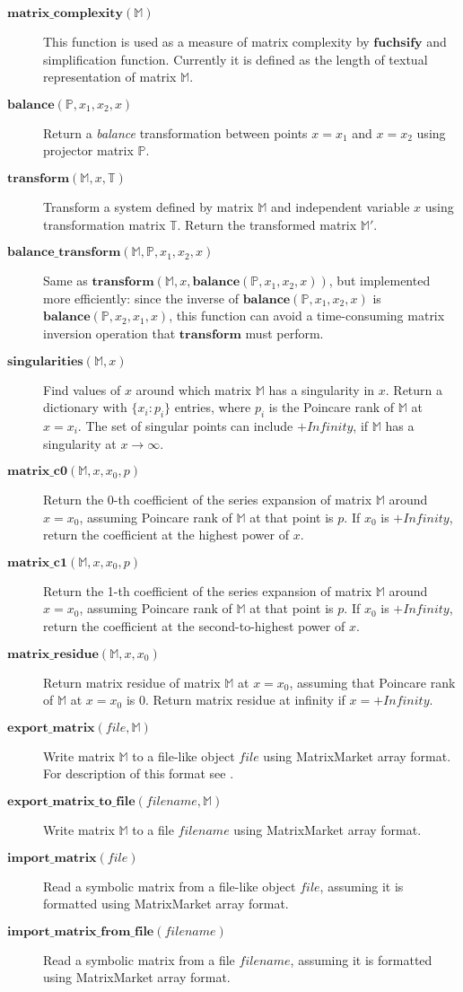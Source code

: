 \documentclass[12pt,a4paper]{article}
\def\F#1{\mathbf{#1}} %
\def\M#1{\mathbb{#1}} %
\def\functionitem#1#2{\item[$\F{#1}(#2)$]}
\begin{document}
\begin{description}
\functionitem{matrix\_complexity}{\M M}
This function is used as a measure of matrix complexity by
$\F{fuchsify}$ and simplification function. Currently it is
defined as the length of textual representation of matrix $\M M$.

\functionitem{balance}{\M P, x_1, x_2, x}
Return a \textit{balance} transformation between points $x=x_1$
and $x=x_2$ using projector matrix $\M P$.

\functionitem{transform}{\M M, x, \M T}
Transform a system defined by matrix $\M M$ and independent
variable $x$ using transformation matrix $\M T$. Return the
transformed matrix $\M M'$.

\functionitem{balance\_transform}{\M M, \M P, x_1, x_2, x}
Same as $\F{transform}(\M M, x, \F{balance}(\M P, x_1, x_2, x))$,
but implemented more efficiently: since the inverse of
$\F{balance}(\M P, x_1, x_2, x)$ is $\F{balance}(\M P, x_2, x_1, x)$,
this function can avoid a time-consuming matrix inversion
operation that $\F{transform}$ must perform.

\functionitem{singularities}{\M M, x}
Find values of $x$ around which matrix $\M M$ has a singularity in
$x$. Return a dictionary with $\{x_i: p_i\}$ entries, where $p_i$
is the Poincare rank of $\M M$ at $x=x_i$. The set of singular points
can include $+Infinity$, if $\M M$ has a singularity at $x\to\infty$.

\functionitem{matrix\_c0}{\M M, x, x_0, p}
Return the 0-th coefficient of the series expansion of matrix
$\M M$ around $x=x_0$, assuming Poincare rank of $\M M$ at that
point is $p$. If $x_0$ is $+Infinity$, return the coefficient
at the highest power of $x$.

\functionitem{matrix\_c1}{\M M, x, x_0, p}
Return the 1-th coefficient of the series expansion of matrix
$\M M$ around $x=x_0$, assuming Poincare rank of $\M M$ at that
point is $p$. If $x_0$ is $+Infinity$, return the coefficient
at the second-to-highest power of $x$.

\functionitem{matrix\_residue}{\M M, x, x_0}
Return matrix residue of matrix $\M M$ at $x=x_0$, assuming that
Poincare rank of $\M M$ at $x=x_0$ is $0$. Return matrix residue
at infinity if $x=+Infinity$.

\functionitem{export\_matrix}{file, \M M}
Write matrix $\M M$ to a file-like object $file$ using MatrixMarket
array format. For description of this format see \cite{BPR96}.

\functionitem{export\_matrix\_to\_file}{filename, \M M}
Write matrix $\M M$ to a file $filename$ using MatrixMarket
array format.

\functionitem{import\_matrix}{file}
Read a symbolic matrix from a file-like object $file$, assuming
it is formatted using MatrixMarket array format.

\functionitem{import\_matrix\_from\_file}{filename}
Read a symbolic matrix from a file $filename$, assuming it is
formatted using MatrixMarket array format.

\end{description}
\end{document}
